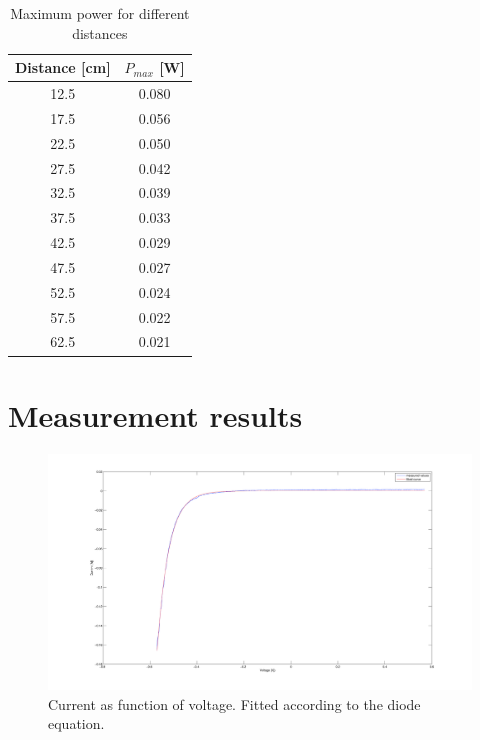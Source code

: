 \documentclass[12pt,a4paper]{article}
\begin{document}
\begin{table}
  \centering
  \begin{tabular}{|c|c|}
    \hline
    Distance [cm] & $P_{max}$ [W] \\
    \hline
    12.5 & 0.080 \\
    17.5 & 0.056 \\
    22.5 & 0.050 \\
    27.5 & 0.042 \\
    32.5 & 0.039 \\
    37.5 & 0.033 \\
    42.5 & 0.029 \\
    47.5 & 0.027 \\
    52.5 & 0.024 \\
    57.5 & 0.022 \\
    62.5 & 0.021 \\
    \hline
  \end{tabular}
  \caption{Maximum power for different distances}
  \label{tab}
\end{table}

\newpage
\section{Measurement results}
\vfill
\begin{figure}[h!]
  \begin{center}
    \includegraphics[scale=0.07]{IvsUnoIlumination.png}
  \end{center}
  \caption{Current as function of voltage. Fitted according to the diode equation.}
  \label{ivsun}
\end{figure}
\end{document}
